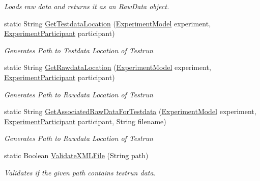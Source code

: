 \begin{DoxyCompactItemize}
\begin{DoxyCompactList}\small\item\em Loads raw data and returns it as an Raw\+Data object. \end{DoxyCompactList}\item 
static String \hyperlink{class_web_analyzer_1_1_controller_1_1_load_controller_a3f5424c02e41a6ea9e0edfd300dc3442}{Get\+Testdata\+Location} (\hyperlink{class_web_analyzer_1_1_models_1_1_base_1_1_experiment_model}{Experiment\+Model} experiment, \hyperlink{class_web_analyzer_1_1_models_1_1_base_1_1_experiment_participant}{Experiment\+Participant} participant)
\begin{DoxyCompactList}\small\item\em Generates Path to Testdata Location of Testrun \end{DoxyCompactList}\item 
static String \hyperlink{class_web_analyzer_1_1_controller_1_1_load_controller_aa61685fae8eaeda3915c7cab8ddfd837}{Get\+Rawdata\+Location} (\hyperlink{class_web_analyzer_1_1_models_1_1_base_1_1_experiment_model}{Experiment\+Model} experiment, \hyperlink{class_web_analyzer_1_1_models_1_1_base_1_1_experiment_participant}{Experiment\+Participant} participant)
\begin{DoxyCompactList}\small\item\em Generates Path to Rawdata Location of Testrun \end{DoxyCompactList}\item 
static String \hyperlink{class_web_analyzer_1_1_controller_1_1_load_controller_a2c83ce274c328d5115152e09e0d32e56}{Get\+Associated\+Raw\+Data\+For\+Testdata} (\hyperlink{class_web_analyzer_1_1_models_1_1_base_1_1_experiment_model}{Experiment\+Model} experiment, \hyperlink{class_web_analyzer_1_1_models_1_1_base_1_1_experiment_participant}{Experiment\+Participant} participant, String filename)
\begin{DoxyCompactList}\small\item\em Generates Path to Rawdata Location of Testrun \end{DoxyCompactList}\item 
static Boolean \hyperlink{class_web_analyzer_1_1_controller_1_1_load_controller_a1ef9f09d7997062e6c84ebd1b99f588f}{Validate\+X\+M\+L\+File} (String path)
\begin{DoxyCompactList}\small\item\em Validates if the given path contains testrun data. \end{DoxyCompactList}\end{DoxyCompactItemize}


